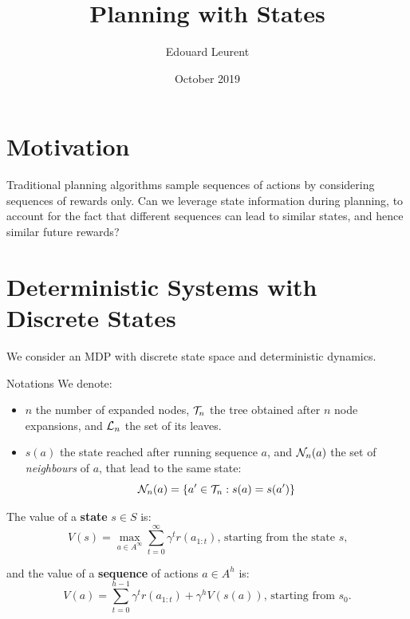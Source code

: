 \documentclass{article}
\title{Planning with States}
\author{Edouard Leurent}
\date{October 2019}
\begin{document}
\maketitle

\tableofcontents

\section{Motivation}

Traditional planning algorithms sample sequences of actions by considering sequences of rewards only. Can we leverage state information during planning, to account for the fact that different sequences can lead to similar states, and hence similar future rewards?

\section{Deterministic Systems with Discrete States}

We consider an MDP with discrete state space and deterministic dynamics.

\begin{paragraph}{Notations}
We denote:
\begin{itemize}
\item $n$ the number of expanded nodes, $\mathcal{T}_n$ the tree obtained after $n$ node expansions, and $\mathcal{L}_n$ the set of its leaves.
    \item $s(a)$ the state reached after running sequence $a$, and $\mathcal{N}_n(a)$ the set of \emph{neighbours} of $a$, that lead to the same state:  \[\mathcal{N}_n(a) = \{a'\in\mathcal{T}_n: s(a)=s(a')\}\]
\end{itemize}
\end{paragraph}

\begin{definition}[Values]
The value of a \textbf{state} $s\in S$ is:
\begin{equation}
    V(s) = \max_{a\in A^\infty} \sum_{t=0}^\infty \gamma^t r(a_{1:t}),\, \text{starting from the state $s$,}
\end{equation}




and the value of a \textbf{sequence} of actions $a\in A^h$ is:
\begin{equation}
\label{eq:state_value}
    V(a) = \sum_{t=0}^{h-1} \gamma^t r(a_{1:t}) + \gamma^{h} V(s(a)),\, \text{starting from $s_0$.}
\end{equation}
\end{definition}
\end{document}
